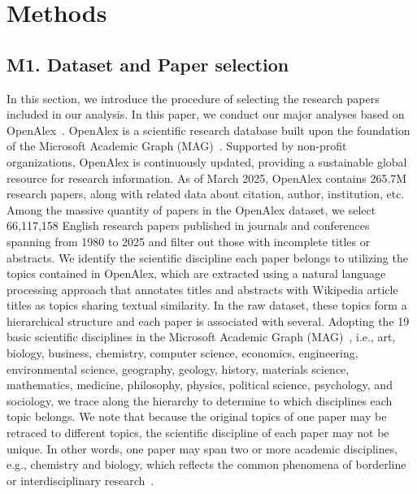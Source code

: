 \section*{Methods}
\subsection*{M1. Dataset and Paper selection}
In this section, we introduce the procedure of selecting the research papers included in our analysis.
In this paper, we conduct our major analyses based on OpenAlex~\supercite{openalex}.
OpenAlex is a scientific research database built upon the foundation of the Microsoft Academic Graph (MAG)~\supercite{mag,oag}.
Supported by non-profit organizations, OpenAlex is continuously updated, providing a sustainable global resource for research information.
As of March 2025, OpenAlex contains 265.7M research papers, along with related data about citation, author, institution, etc.
Among the massive quantity of papers in the OpenAlex dataset, we select 66,117,158 English research papers published in journals and conferences spanning from 1980 to 2025 and filter out those with incomplete titles or abstracts.
We identify the scientific discipline each paper belongs to utilizing the topics contained in OpenAlex, which are extracted using a natural language processing approach that annotates titles and abstracts with Wikipedia article titles as topics sharing textual similarity.
In the raw dataset, these topics form a hierarchical structure and each paper is associated with several.
Adopting the 19 basic scientific disciplines in the Microsoft Academic Graph (MAG)~\supercite{mag,oag}, i.e., art, biology, business, chemistry, computer science, economics, engineering, environmental science, geography, geology, history, materials science, mathematics, medicine, philosophy, physics, political science, psychology, and sociology, we trace along the hierarchy to determine to which disciplines each topic belongs.
We note that because the original topics of one paper may be retraced to different topics, the scientific discipline of each paper may not be unique.
In other words, one paper may span two or more academic disciplines, e.g., chemistry and biology, which reflects the common phenomena of borderline or interdisciplinary research~\supercite{porter2009science}.

